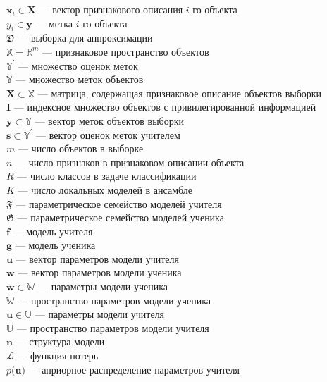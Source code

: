 \noindent
$\textbf{x}_i \in \textbf{X}$ --- вектор признакового описания $i$-го объекта\\
$y_i \in \mathbf{y}$ --- метка $i$-го объекта\\
$\mathfrak{D}$ --- выборка для аппроксимации\\
$\mathbb{X} = \mathbb{R}^m$ --- признаковое пространство объектов\\
$\mathbb{Y}^{'}$ --- множество оценок меток\\
$\mathbb{Y}$ --- множество меток объектов\\
$\textbf{X} \subset \mathbb{X}$ --- матрица, содержащая признаковое описание объектов выборки\\
$\mathbf{I}$ --- индексное множество объектов с привилегированной информацией\\
$\textbf{y} \subset \mathbb{Y}$ --- вектор меток объектов выборки\\
$\mathbf{s} \subset \mathbb{Y}^{'}$ --- вектор оценок меток учителем\\
$m$ --- число объектов в выборке\\
$n$ --- число признаков в признаковом описании объекта\\
$R$ --- число классов в задаче классификации\\
$K$ --- число локальных моделей в ансамбле\\
$\mathfrak{F}$ --- параметрическое семейство моделей учителя\\
$\mathfrak{G}$ --- параметрическое семейство моделей ученика\\
$\mathbf{f}$ --- модель учителя\\
$\mathbf{g}$ --- модель ученика\\
$\mathbf{u}$ --- вектор параметров модели учителя\\
$\mathbf{w}$ --- вектор параметров модели ученика\\
$\textbf{w} \in \mathbb{W}$ --- параметры модели ученика\\
$\mathbb{W}$ --- пространство параметров модели ученика\\
$\textbf{u} \in \mathbb{U}$ --- параметры модели учителя\\
$\mathbb{U}$ --- пространство параметров модели учителя\\
$\mathbf{n}$ --- структура модели\\
$\mathcal{L}$ --- функция потерь\\
$p\bigr(\mathbf{u}\bigr)$ --- априорное распределение параметров учителя\\
